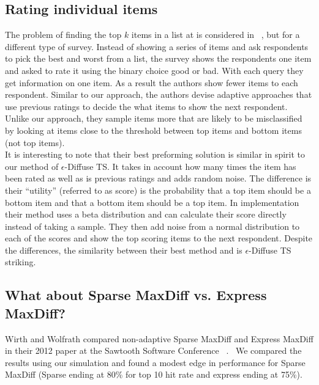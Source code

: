 \documentclass[nonblindrev]{informs3}
\begin{document}
\subsection{Rating individual items}
The problem of finding the top $k$ items in a list at is considered in ~\cite{toubia2007adaptive}, but for a different type of survey. Instead of showing a series of items and ask respondents to pick the best and worst from a list, the survey shows the respondents one item and asked to rate it using the binary choice good or bad. With each query they get information on one item. As a result the authors show fewer items to each respondent. Similar to our approach, the authors devise adaptive approaches that use previous ratings to decide the what items to show the next respondent.  Unlike our approach, they sample items more that are likely to be misclassified by looking at items close to the threshold between top items and bottom items (not top items).\\
It is interesting to note that their best preforming solution is similar in spirit to our method of $\epsilon$-Diffuse TS. It takes in account how many times the item has been rated as well as is previous ratings and adds random noise. The difference is their ``utility'' (referred to as score) is the probability that a top item should be a bottom item and that a bottom item should be a top item. In implementation their method uses a beta distribution and can calculate their score directly instead of taking a sample. They then add noise from a normal distribution to each of the scores and show the top scoring items to the next respondent. Despite the differences, the similarity between their best method and is $\epsilon$-Diffuse TS striking.

\subsection{What about Sparse MaxDiff vs. Express MaxDiff?}
Wirth and Wolfrath compared non-adaptive Sparse MaxDiff and Express MaxDiff in their 2012 paper at the Sawtooth Software Conference ~\cite{wirth2012largeset}.  We compared the results using our simulation and found a modest edge in performance for Sparse MaxDiff (Sparse ending at 80\% for top 10 hit rate and express ending at 75\%).
\end{document}
